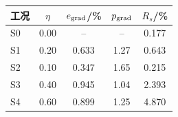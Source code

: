\begin{tabular}{@{}lS[table-format=1.2]S[table-format=1.3]S[table-format=1.2]S[table-format=1.3]@{}}
\toprule
工况 & {$\eta$} & {$e_{\rm grad}$/\%} & {$p_{\rm grad}$} & {$R_s$/\%} \\
\midrule
S0 & 0.00 &  &  & 0.177 \\
S1 & 0.20 & 0.633 & 1.27 & 0.643 \\
S2 & 0.10 & 0.347 & 1.65 & 0.215 \\
S3 & 0.40 & 0.945 & 1.04 & 2.393 \\
S4 & 0.60 & 0.899 & 1.25 & 4.870 \\
\bottomrule
\end{tabular}

